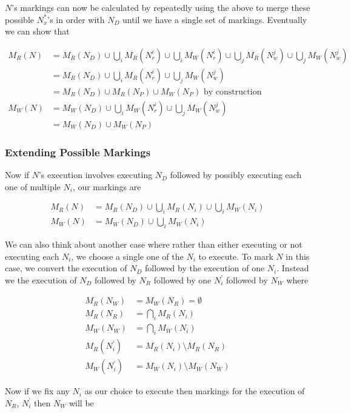 \documentclass{report}
\begin{document}
$N$'s markings can now be calculated by repeatedly using the above to merge these possible $N^*_x$'s in order with $N_D$ until we have a single set of markings.
Eventually we can show that 

\begin{align*}
M_R(N) &= M_R(N_D) \cup \bigcup_i M_R(N_r^i) \cup \bigcup_i M_W(N_r^i) \cup \bigcup_j M_R(N_w^j) \cup \bigcup_j M_W(N_w^j) \\
       &= M_R(N_D) \cup \bigcup_i M_R(N_r^i) \cup \bigcup_j M_W(N_w^j) \\
       &= M_R(N_D) \cup M_R(N_P) \cup M_W(N_P) \text{ by construction} \\
M_W(N) &= M_W(N_D) \cup \bigcup_i M_W(N_r^i) \cup \bigcup_j M_W(N_w^j) \\
       &= M_W(N_D) \cup M_W(N_P)
\end{align*}

\subsubsection{Extending Possible Markings}

Now if $N$'s execution involves executing $N_D$ followed by possibly executing each one of multiple $N_i$, our markings are

\begin{align*}
M_R(N) &= M_R(N_D) \cup \bigcup_i M_R(N_i) \cup \bigcup_i M_W(N_i) \\
M_W(N) &= M_W(N_D) \cup \bigcup_i M_W(N_i)
\end{align*}

We can also think about another case where rather than either executing or not executing each $N_i$, we choose a single one of the
$N_i$ to execute. To mark $N$ in this case, we convert the execution of $N_D$ followed by the execution of one $N_i$. Instead we the
execution of $N_D$ followed by $N_R$ followed by one $N_i^\prime$ followed by $N_W$ where

\begin{align*}
M_R(N_W) &= M_W(N_R) = \emptyset \\
M_R(N_R)        &= \bigcap_i M_R(N_i) \\
M_W(N_W)        &= \bigcap_i M_W(N_i) \\
M_R(N_i^\prime) &= M_R(N_i) \setminus M_R(N_R) \\
M_W(N_i^\prime) &= M_W(N_i) \setminus M_W(N_W)
\end{align*} 

Now if we fix any $N_i$ as our choice to execute then markings for the execution of $N_R$, $N_i^\prime$ then $N_W$ will be
\end{document}
